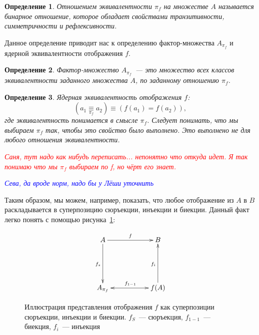 \documentclass[a4paper, 12pt]{report}
\newtheorem{definition}{Определение}[chapter]
\begin{document}
\begin{definition}
Отношением эквивалентности $\pi_f$ на множестве $A$ называется бинарное отношение, которое обладает свойствами транзитивности, симметричности и рефлексивности.
\end{definition}

Данное определение приводит нас к определению фактор-множества $A_{\pi_f}$ и ядерной эквивалентности отображения $f$.

\begin{definition}
Фактор-множество $A_{\pi_f}$~--- это множество всех классов эквивалентности заданного множества $A$, по заданному отношению $\pi_f$.
\end{definition}

\begin{definition}
Ядерная эквивалентность отображения $f$:
\[
(a_1\mathop{\equiv}\limits_{\pi_f} a_2) \equiv (f(a_1) = f(a_2)),
\]
где эквивалентность понимается в смысле $\pi_f$. Следует понимать, что мы выбираем $\pi_f$ так, чтобы это свойство было выполнено. Это выполнено не для любого отношения эквивалентности.

\textcolor{red}{Саня, тут надо как нибудь переписать... непонятно что откуда идет. Я так понимаю что мы $\pi_f$ выбираем по f, но чёрт его знает.}

\textcolor{blue}{Сева, да вроде норм, надо бы у Лёши уточнить}
\end{definition}

Таким образом, мы можем, например, показать, что любое отображение из $A$ в $B$ раскладывается в суперпозицию сюръекции, инъекции и биекции. Данный факт легко понять с помощью рисунка~\ref{fig::superpos}:


\begin{figure}[!h]
\begin{equation*}
\xymatrix{
A \ar[rr]^f\ar[dd]_{f_s} & & B\\
&\\
A_{\pi_f}\ar@{<->}[rr]^{f_{1-1}} & & f(A)\ar[uu]^{f_i}
}
\end{equation*}
\caption{Иллюстрация представления отображения $f$ как суперпозиции сюръекции, инъекции и биекции. $f_S$~--- сюръекция, $f_{1-1}$~--- биекция, $f_i$~--- инъекция}
\label{fig::superpos}
\end{figure}
\end{document}
